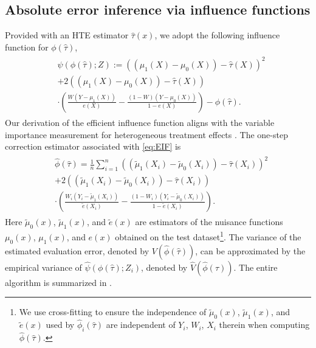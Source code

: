 \documentclass[twoside]{article}
\newcommand{\1}{{\mathbbm{1}}}
\begin{document}
\subsection{Absolute error inference via influence functions}\label{sec:absolute.error.estimation}
Provided with an HTE estimator $\hat{\tau}(x)$,
we adopt the following influence function for $\phi(\hat{\tau})$, 
\begin{align}\label{eq:EIF}
\begin{split}    
    &\psi(\phi(\hat{\tau}); Z)
    :=  \left((\mu_1(X) - \mu_0(X)) - \hat{\tau}(X)\right)^2 \\
    &+ 2\left((\mu_1(X) - \mu_0(X)) - \hat{\tau}(X)\right)\\ 
    &\cdot \left(\frac{W(Y - \mu_1(X))}{e(X)} - \frac{(1-W)(Y - \mu_0(X))}{1-e(X)} \right) - \phi(\hat{\tau}).
\end{split}
\end{align}
Our derivation of the efficient influence function aligns with the variable importance measurement for heterogeneous treatment effects \parencite{hines2022variable}.
The one-step correction estimator associated with \eqref{eq:EIF} is
\begin{align}\label{eq:estimator.absolute.error}
\begin{split}    
    &\hat{\phi}(\hat{\tau})
    = \frac{1}{n} \sum_{i=1}^n \left((\tilde{\mu}_1(X_i) - \tilde{\mu}_0(X_i)) - \hat{\tau}(X_i)\right)^2  \\
    &+ 2\left((\tilde{\mu}_1(X_i) - \tilde{\mu}_0(X_i)) - \hat{\tau}(X_i)\right) \\
    &\cdot \left(\frac{W_i(Y_i - \tilde{\mu}_1(X_i))}{\tilde{e}(X_i)} - \frac{(1-W_i)(Y_i - \tilde{\mu}_0(X_i))}{1-\tilde{e}(X_i)} \right).
\end{split}
\end{align}
Here $\tilde{\mu}_0(x)$, $\tilde{\mu}_1(x)$, and $\tilde{e}(x)$ are estimators of the nuisance functions ${\mu}_0(x)$, ${\mu}_1(x)$, and $e(x)$ obtained on the test dataset\footnote{We use cross-fitting \parencite{chernozhukov2018double} to ensure the independence of $\tilde{\mu}_0(x)$, $\tilde{\mu}_1(x)$, and $\tilde{e}(x)$ used by $\hat{\phi}_i(\hat{\tau})$ are independent of $Y_i$, $W_i$, $X_i$ therein when computing $\hat{\phi}(\hat{\tau})$.}.
The variance of the estimated evaluation error, denoted by ${V}(\hat{\phi}(\hat{\tau}))$, can be approximated by the empirical variance of $\hat{\psi}(\phi(\hat{\tau}); Z_i)$, denoted by $\hat{V}(\hat{\phi}(\hat{\tau}))$.
The entire algorithm is summarized in .
\end{document}
